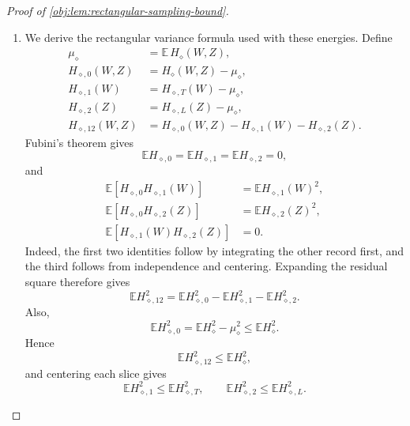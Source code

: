 \documentclass[11pt]{article}
\begin{document}
\begin{proof}[Proof of \cref{obj:lem:rectangular-sampling-bound}]
\begin{enumerate}
Define the integrated slices on the full record domains by
\[
H_{\diamond,T}(W)=\mathbb E_Z H_\diamond(W,Z),
\qquad
H_{\diamond,L}(Z)=\mathbb E_W H_\diamond(W,Z),
\]
where each expectation integrates an independent record with the law specified above. The row-integral estimate gives
\[
\begin{aligned}
\left|
 \mathbb E_Z\!\left[
 w_h(X^L)K_J(x,X^L)f_{\diamond,L}(Z)
 \right]\right|
&\le M_d\,\mathbb E_Z\!
 \left[w_h(X^L)|K_J(x,X^L)|\right]\\
&=M_d\int |K_J(x,x')|\,d\nu_h(x')\\
&\le M_dD_d.
\end{aligned}
\]
Consequently,
\[
|H_{\diamond,T}(W)|
\le M_d^2D_d\,w_h(X^T).
\]
Kernel symmetry gives the corresponding bound with the roles reversed:
\[
|H_{\diamond,L}(Z)|
\le M_d^2D_d\,w_h(X^L).
\]
Squaring and integrating yields
\[
\mathbb E\,H_{\diamond,T}(W)^2
\le\frac{M_d^4D_d^2}{h^d},
\qquad
\mathbb E\,H_{\diamond,L}(Z)^2
\le\frac{M_d^4D_d^2}{h^d}.
\]
All the displayed features and kernels are measurable and square-integrable. In particular, their means, centered squares, and finite-sum integrals are well defined.

\item We derive the rectangular variance formula used with these energies. Define
\[
\begin{aligned}
\mu_\diamond&=\mathbb E\,H_\diamond(W,Z),\\
H_{\diamond,0}(W,Z)&=H_\diamond(W,Z)-\mu_\diamond,\\
H_{\diamond,1}(W)&=H_{\diamond,T}(W)-\mu_\diamond,\\
H_{\diamond,2}(Z)&=H_{\diamond,L}(Z)-\mu_\diamond,\\
H_{\diamond,12}(W,Z)
&=H_{\diamond,0}(W,Z)-H_{\diamond,1}(W)-H_{\diamond,2}(Z).
\end{aligned}
\]
Fubini's theorem gives
\[
\mathbb E H_{\diamond,0}
=\mathbb E H_{\diamond,1}
=\mathbb E H_{\diamond,2}=0,
\]
and
\[
\begin{aligned}
\mathbb E\!\left[H_{\diamond,0}H_{\diamond,1}(W)\right]
&=\mathbb E H_{\diamond,1}(W)^2,\\
\mathbb E\!\left[H_{\diamond,0}H_{\diamond,2}(Z)\right]
&=\mathbb E H_{\diamond,2}(Z)^2,\\
\mathbb E\!\left[H_{\diamond,1}(W)H_{\diamond,2}(Z)\right]
&=0.
\end{aligned}
\]
Indeed, the first two identities follow by integrating the other record first, and the third follows from independence and centering. Expanding the residual square therefore gives
\[
\mathbb E H_{\diamond,12}^2
=\mathbb E H_{\diamond,0}^2
 -\mathbb E H_{\diamond,1}^2
 -\mathbb E H_{\diamond,2}^2.
\]
Also,
\[
\mathbb E H_{\diamond,0}^2
=\mathbb E H_\diamond^2-\mu_\diamond^2
\le\mathbb E H_\diamond^2.
\]
Hence
\[
\mathbb E H_{\diamond,12}^2\le\mathbb E H_\diamond^2,
\]
and centering each slice gives
\[
\mathbb E H_{\diamond,1}^2
\le\mathbb E H_{\diamond,T}^2,
\qquad
\mathbb E H_{\diamond,2}^2
\le\mathbb E H_{\diamond,L}^2.
\]


\end{enumerate}
\end{proof}
\end{document}
